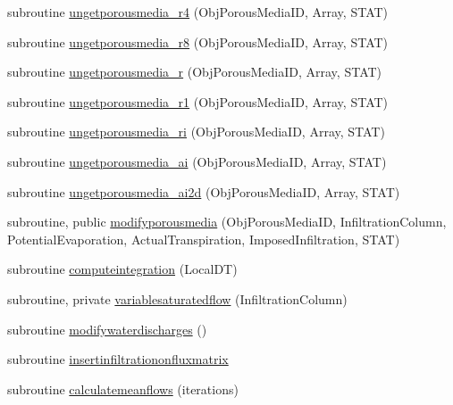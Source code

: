 \begin{DoxyCompactItemize}
subroutine \mbox{\hyperlink{namespacemoduleporousmedia_a90cbc92ae3cf9c9c828403c5fdc6c414}{ungetporousmedia\+\_\+r4}} (Obj\+Porous\+Media\+ID, Array, S\+T\+AT)
\item 
subroutine \mbox{\hyperlink{namespacemoduleporousmedia_a4341a39680ae8538342f20cb21df9b6a}{ungetporousmedia\+\_\+r8}} (Obj\+Porous\+Media\+ID, Array, S\+T\+AT)
\item 
subroutine \mbox{\hyperlink{namespacemoduleporousmedia_a762615c8c034a45d738dd8a156eeed72}{ungetporousmedia\+\_\+r}} (Obj\+Porous\+Media\+ID, Array, S\+T\+AT)
\item 
subroutine \mbox{\hyperlink{namespacemoduleporousmedia_ac6425bf5e26a5219b8c52bbabeda12ce}{ungetporousmedia\+\_\+r1}} (Obj\+Porous\+Media\+ID, Array, S\+T\+AT)
\item 
subroutine \mbox{\hyperlink{namespacemoduleporousmedia_a1ceb6ca7f8349192893a0bd63cf7403d}{ungetporousmedia\+\_\+ri}} (Obj\+Porous\+Media\+ID, Array, S\+T\+AT)
\item 
subroutine \mbox{\hyperlink{namespacemoduleporousmedia_ad36e11e27240926924cf03325b9a47bc}{ungetporousmedia\+\_\+ai}} (Obj\+Porous\+Media\+ID, Array, S\+T\+AT)
\item 
subroutine \mbox{\hyperlink{namespacemoduleporousmedia_a287c849b30a2dc7af1280cf983edfb8d}{ungetporousmedia\+\_\+ai2d}} (Obj\+Porous\+Media\+ID, Array, S\+T\+AT)
\item 
subroutine, public \mbox{\hyperlink{namespacemoduleporousmedia_a382cfd35fca1c040d9c4d2fb68011276}{modifyporousmedia}} (Obj\+Porous\+Media\+ID, Infiltration\+Column, Potential\+Evaporation, Actual\+Transpiration, Imposed\+Infiltration, S\+T\+AT)
\item 
subroutine \mbox{\hyperlink{namespacemoduleporousmedia_a7f0fec21916c2f7aad9c56e3af1c8cae}{computeintegration}} (Local\+DT)
\item 
subroutine, private \mbox{\hyperlink{namespacemoduleporousmedia_a616ff2e8e3230ac9ca5923369b4d8cfc}{variablesaturatedflow}} (Infiltration\+Column)
\item 
subroutine \mbox{\hyperlink{namespacemoduleporousmedia_a1a0af39f7098b5de11c64c15cb6f4c39}{modifywaterdischarges}} ()
\item 
subroutine \mbox{\hyperlink{namespacemoduleporousmedia_a981859707e33f26a3f78d09d6f170f12}{insertinfiltrationonfluxmatrix}}
\item 
subroutine \mbox{\hyperlink{namespacemoduleporousmedia_a25f85d61b730aa85aca7f9dded8b38b5}{calculatemeanflows}} (iterations)
\item 

\end{DoxyCompactItemize}
